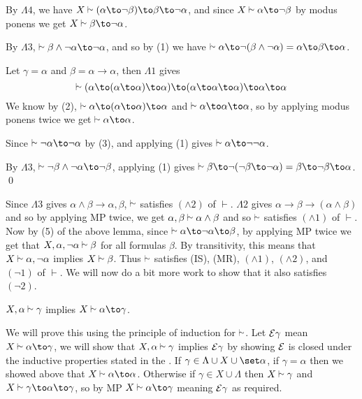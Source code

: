 \elemm

\benum
    \item By $\Lambda4$, we have $X\vsim(\alpha\to\neg\beta)\to\beta\to\neg\alpha$, and since $X\vsim\alpha\to\neg\beta$ by modus ponens we get $X\vsim\beta\to\neg\alpha$.
    \item By $\Lambda3$, $\vsim\beta\land\neg\alpha\to\neg\alpha$, and so by (1) we have $\vsim\alpha\to\neg(\beta\land\neg\alpha)=\alpha\to\beta\to\alpha$.
    \item Let $\gamma=\alpha$ and $\beta=\alpha\to\alpha$, then $\Lambda1$ gives
    $$ \vsim(\alpha\to(\alpha\to\alpha)\to\alpha)\to(\alpha\to\alpha\to\alpha)\to\alpha\to\alpha $$
    We know by (2), $\vsim\alpha\to(\alpha\to\alpha)\to\alpha$ and $\vsim\alpha\to\alpha\to\alpha$, so by applying modus ponens twice we get $\vsim\alpha\to\alpha$.
    \item Since $\vsim\neg\alpha\to\neg\alpha$ by (3), and applying (1) gives $\vsim\alpha\to\neg\neg\alpha$.
    \item By $\Lambda3$, $\vsim\neg\beta\land\neg\alpha\to\neg\beta$, applying (1) gives $\vsim\beta\to\neg(\neg\beta\to\neg\alpha)=\beta\to\neg\beta\to\alpha$.
    \qed
\eenum

Since $\Lambda3$ gives $\alpha\land\beta\to\alpha,\beta$, $\vsim$ satisfies $(\land2)$ of $\vdash$.
$\Lambda2$ gives $\alpha\to\beta\to(\alpha\land\beta)$ and so by applying MP twice, we get $\alpha,\beta\vsim\alpha\land\beta$ and so $\vsim$ satisfies $(\land1)$ of $\vdash$.
Now by (5) of the above lemma, since $\vsim\alpha\to\neg\alpha\to\beta$, by applying MP twice we get that $X,\alpha,\neg\alpha\vsim\beta$ for all formulas $\beta$.
By transitivity, this means that $X\vsim\alpha,\neg\alpha$ implies $X\vsim\beta$.
Thus $\vsim$ satisfies (IS), (MR), $(\land1)$, $(\land2)$, and $(\neg1)$ of $\vdash$.
We will now do a bit more work to show that it also satisfies $(\neg2)$.

\blemm[title=The Deduction Theorem, name=deductthrm]

    $X,\alpha\vsim\gamma$ implies $X\vsim\alpha\to\gamma$.

\elemm

We will prove this using the principle of induction for $\vsim$.
Let ${\cal E}\gamma$ mean $X\vsim\alpha\to\gamma$, we will show that $X,\alpha\vsim\gamma$ implies ${\cal E}\gamma$ by showing ${\cal E}$ is closed under the inductive properties stated in the
.
If $\gamma\in\Lambda\cup X\cup\set\alpha$, if $\gamma=\alpha$ then we showed above that $X\vsim\alpha\to\alpha$.
Otherwise if $\gamma\in X\cup\Lambda$ then $X\vsim\gamma$ and $X\vsim\gamma\to\alpha\to\gamma$, so by MP $X\vsim\alpha\to\gamma$ meaning ${\cal E}\gamma$ as required.


